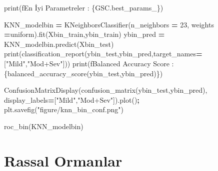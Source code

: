 \documentclass[12pt,twoside]{deuthesis}
\newenvironment{Shaded}{\begin{snugshade}}{\end{snugshade}}
\newcommand{\BuiltInTok}[1]{#1}
\newcommand{\DecValTok}[1]{\textcolor[rgb]{0.00,0.00,0.81}{#1}}
\newcommand{\NormalTok}[1]{#1}
\newcommand{\OperatorTok}[1]{\textcolor[rgb]{0.81,0.36,0.00}{\textbf{#1}}}
\newcommand{\SpecialCharTok}[1]{\textcolor[rgb]{0.00,0.00,0.00}{#1}}
\newcommand{\SpecialStringTok}[1]{\textcolor[rgb]{0.31,0.60,0.02}{#1}}
\newcommand{\StringTok}[1]{\textcolor[rgb]{0.31,0.60,0.02}{#1}}
\begin{document}
\begin{Shaded}
\begin{Highlighting}[]
\BuiltInTok{print}\NormalTok{(}\SpecialStringTok{f\textquotesingle{}En İyi Parametreler : }\SpecialCharTok{\{}\NormalTok{GSC}\SpecialCharTok{.}\NormalTok{best\_params\_}\SpecialCharTok{\}}\SpecialStringTok{\textquotesingle{}}\NormalTok{)}
\end{Highlighting}
\end{Shaded}
\begin{Shaded}
\begin{Highlighting}[]
\NormalTok{KNN\_modelbin }\OperatorTok{=}\NormalTok{ KNeighborsClassifier(n\_neighbors }\OperatorTok{=} \DecValTok{23}\NormalTok{,}
\NormalTok{                                 weights }\OperatorTok{=}\StringTok{\textquotesingle{}uniform\textquotesingle{}}\NormalTok{).fit(Xbin\_train,ybin\_train)}
\NormalTok{ybin\_pred }\OperatorTok{=}\NormalTok{ KNN\_modelbin.predict(Xbin\_test)}
\BuiltInTok{print}\NormalTok{(classification\_report(ybin\_test,ybin\_pred,target\_names}\OperatorTok{=}\NormalTok{[}\StringTok{"Mild"}\NormalTok{,}\StringTok{"Mod+Sev"}\NormalTok{]))}
\BuiltInTok{print}\NormalTok{(}\SpecialStringTok{f\textquotesingle{}Balanced Accuracy Score : }\SpecialCharTok{\{}\NormalTok{balanced\_accuracy\_score(ybin\_test,ybin\_pred)}\SpecialCharTok{\}}\SpecialStringTok{\textquotesingle{}}\NormalTok{)}
\end{Highlighting}
\end{Shaded}
\begin{Shaded}
\begin{Highlighting}[]
\NormalTok{ConfusionMatrixDisplay(confusion\_matrix(ybin\_test,ybin\_pred),}
\NormalTok{                       display\_labels}\OperatorTok{=}\NormalTok{[}\StringTok{"Mild"}\NormalTok{,}\StringTok{"Mod+Sev"}\NormalTok{]).plot()}\OperatorTok{;}
\NormalTok{plt.savefig(}\StringTok{"figure/knn\_bin\_conf.png"}\NormalTok{)}
\end{Highlighting}
\end{Shaded}
\begin{Shaded}
\begin{Highlighting}[]
\NormalTok{roc\_bin(KNN\_modelbin)}
\end{Highlighting}
\end{Shaded}
\normalsize

\hypertarget{rassal-ormanlar-1}{%
\section{Rassal Ormanlar}\label{rassal-ormanlar-1}}
\end{document}

